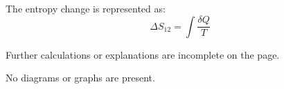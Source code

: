The entropy change is represented as:  
\[
\Delta S_{12} = \int \frac{\delta Q}{T}
\]  

Further calculations or explanations are incomplete on the page.  

No diagrams or graphs are present.